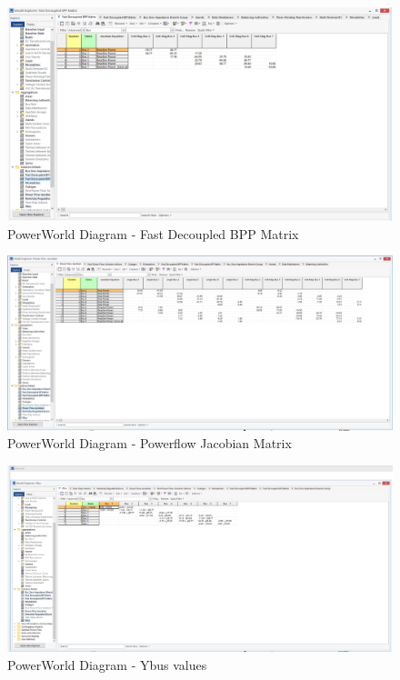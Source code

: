 \documentclass[12pt]{article}
\begin{document}
        \begin{figure}[H]
            \centerline{\includegraphics[scale=0.3]{images/PowerWorldTable7}}
            \caption{PowerWorld Diagram - Fast Decoupled BPP Matrix}
        \end{figure}
        \begin{figure}[H]
            \centerline{\includegraphics[scale=0.3]{images/PowerWorldTable8}}
            \caption{PowerWorld Diagram - Powerflow Jacobian Matrix}
        \end{figure}
        \begin{figure}[H]
            \centerline{\includegraphics[scale=0.3]{images/PowerWorldTable9}}
            \caption{PowerWorld Diagram - Ybus values}
        \end{figure}
\end{document}
